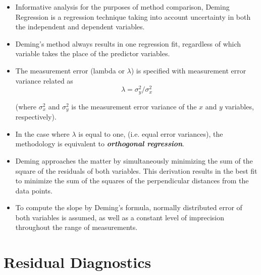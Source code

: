 \documentclass[12pt, a4paper]{report}
\theoremstyle{plain}
\theoremstyle{definition}
\theoremstyle{remark}
\begin{document}
	\begin{itemize}
		\item Informative analysis for the purposes of method comparison, Deming Regression is a regression technique taking into account uncertainty in both the independent and dependent variables.
		
		\item Deming’s method always results in one regression fit, regardless of which variable takes the place of the predictor variables.
		
		
		
		\item The measurement error (lambda or $\lambda$) is specified with measurement error variance related as 
		\[\lambda = \sigma^2_y/\sigma^2_x\]
		
		(where $\sigma^2_x$ and $\sigma^2_y$ is the measurement error variance of the $x$ and $y$ variables, respectively).
		
		\item In the case where $\lambda$ is equal to one, (i.e. equal error variances), the methodology is equivalent to \textit{\textbf{orthogonal regression}}.
		
		\item Deming approaches the matter by simultaneously minimizing the sum of the square of the residuals of both variables. This derivation results in the best fit to minimize the sum of the squares of the perpendicular distances from the data points.
		
		\item To compute the slope by Deming’s formula,  normally distributed error of both variables  is assumed, as well as a constant level of imprecision throughout the range of measurements.
		
	\end{itemize}
	
	\chapter{Residual Diagnostics}
	
\end{document}
